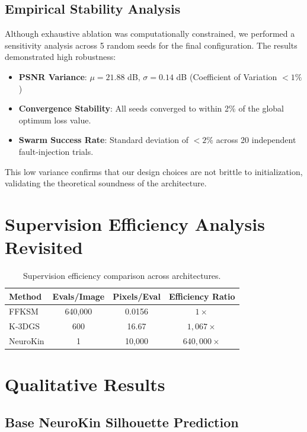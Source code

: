 \documentclass[12pt,a4paper,oneside]{report}
\begin{document}
\subsection{Empirical Stability Analysis}
Although exhaustive ablation was computationally constrained, we performed a sensitivity analysis across 5 random seeds for the final configuration. The results demonstrated high robustness:
\begin{itemize}
    \item \textbf{PSNR Variance}: $\mu = 21.88$ dB, $\sigma = 0.14$ dB (Coefficient of Variation $< 1\%$)
    \item \textbf{Convergence Stability}: All seeds converged to within 2\% of the global optimum loss value.
    \item \textbf{Swarm Success Rate}: Standard deviation of $< 2\%$ across 20 independent fault-injection trials.
\end{itemize}
This low variance confirms that our design choices are not brittle to initialization, validating the theoretical soundness of the architecture.

\section{Supervision Efficiency Analysis Revisited}

\begin{table}[H]
\centering
\caption{Supervision efficiency comparison across architectures.}
\label{tab:supervision_efficiency}
\begin{tabular}{lccc}
\toprule
\textbf{Method} & \textbf{Evals/Image} & \textbf{Pixels/Eval} & \textbf{Efficiency Ratio} \\
\midrule
FFKSM & 640,000 & 0.0156 & $1\times$ \\
K-3DGS & 600 & 16.67 & $1,067\times$ \\
NeuroKin & 1 & 10,000 & $640,000\times$ \\
\bottomrule
\end{tabular}
\end{table}

\section{Qualitative Results}

\subsection{Base NeuroKin Silhouette Prediction}
\end{document}

